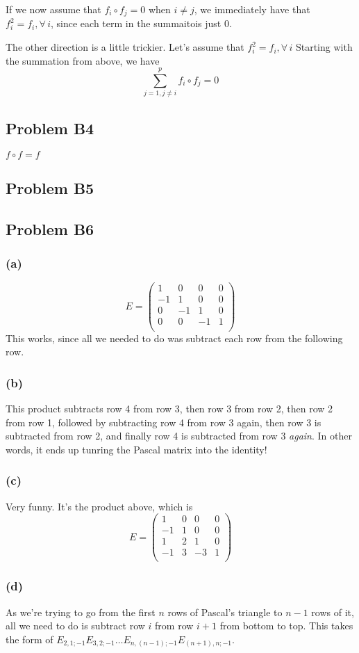 \documentclass{article}
\begin{document}
If we now assume that $f_i \circ f_j = 0$ when $i \neq j$, we immediately have
that $f_i^2 = f_i, \forall\, i$, since each term in the summaitois just 0.

The other direction is a little trickier. Let's assume that $f_i^2  = f_i,
\forall\, i$
Starting with the summation from above, we have
\[\sum_{j=1,j \neq i}^p f_i \circ f_j = 0 \]

\subsection{Problem B4}
$f \circ f = f$

\subsection{Problem B5}
\subsection{Problem B6}
\subsubsection{(a)}
\[
E=\left( 
\begin{array}{cccc}
1 &0 &0 &0\\
-1&1 &0 &0\\
0 &-1&1 &0\\
0 &0 &-1&1\\
\end{array}
\right)
\]
This works, since all we needed to do was subtract each row from the following
row.
\subsubsection{(b)}
This product subtracts row 4 from row 3, then row 3 from row 2, then row 2 from
row 1, followed by subtracting row 4 from row 3 again, then row 3 is subtracted
from row 2, and finally row 4 is subtracted from row 3 \emph{again}.
In other words, it ends up tunring the Pascal matrix into the identity!
\subsubsection{(c)}
Very funny. It's the product above, which is 
\[
E=\left( 
\begin{array}{cccc}
1 &0 &0 &0\\
-1&1 &0 &0\\
1 &2 &1 &0\\
-1&3 &-3&1\\
\end{array}
\right)
\]

\subsubsection{(d)}
As we're trying to go from the first $n$ rows of Pascal's triangle to $n-1$ rows
of it, all we need to do is subtract row $i$ from row $i+1$ from bottom to top.
This takes the form of
$E_{2,1;-1}E_{3,2;-1}\dots E_{n,(n-1); -1}E_{(n+1),n; -1}$.
\end{document}
